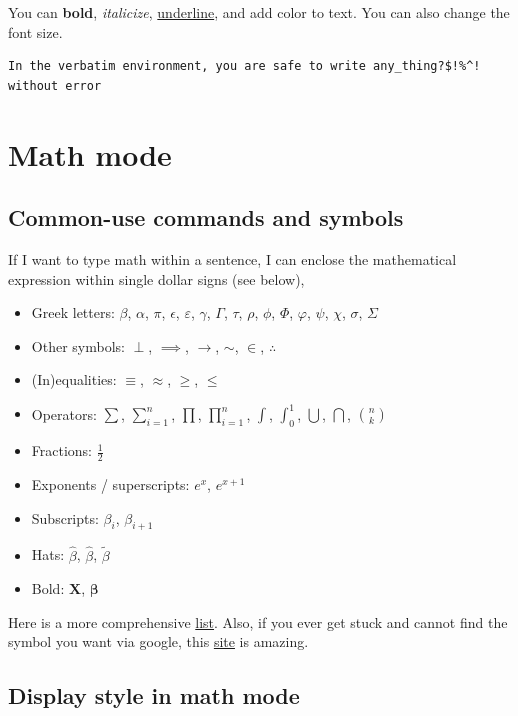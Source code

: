 \documentclass[11pt, oneside]{article}
\begin{document}
You can \textbf{bold}, \textit{italicize}, \underline{underline}, and add \color{red} color \color{black} to text. You can also change the \large{font} \huge{size}. \normalsize

\begin{verbatim}
In the verbatim environment, you are safe to write any_thing?$!%^! without error
\end{verbatim}

\section{Math mode} 


\subsection{Common-use commands and symbols} 
If I want to type math within a sentence, I can enclose the mathematical expression within single dollar signs (see below), 

\begin{itemize}
	\item Greek letters: $\beta$, $\alpha$, $\pi$, $\epsilon$, $\varepsilon$, $\gamma$, $\Gamma$, $\tau$, $\rho$, $\phi$, $\Phi$, $\varphi$, $\psi$, $\chi$, $\sigma$, $\Sigma$
	\item Other symbols: $\perp$, $\implies$, $\rightarrow$, $\sim$, $\in$,  $\therefore$
	\item (In)equalities: $\equiv$, $\approx$, $\geq$, $\leq$ 
	\item Operators: $\sum$, $\sum_{i=1}^n$, $\prod$, $\prod_{i=1}^n$, $\int$, $\int_{0}^{1}$, $\bigcup$, $\bigcap$, $\binom{n}{k}$
	\item Fractions:  $\frac{1}{2}$
	\item Exponents / superscripts: $e^x$, $e^{x+1}$
	\item Subscripts: $\beta_i$, $\beta_{i+1}$ 
	\item Hats: $\hat{\beta}$, $\widehat{\beta}$, $\tilde{\beta}$
	\item Bold: $\mathbf{X}$, $\boldsymbol{\beta}$
\end{itemize}

\noindent Here is a more comprehensive \href{https://oeis.org/wiki/List_of_LaTeX_mathematical_symbols}{list}. Also, if you ever get stuck and cannot find the symbol you want via google, this \href{http://detexify.kirelabs.org/classify.html}{site} is amazing.

\subsection{Display style in math mode} 
\end{document}
